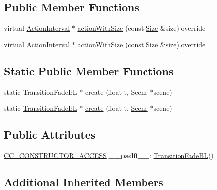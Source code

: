 \subsection*{Public Member Functions}
\begin{DoxyCompactItemize}
\item 
virtual \hyperlink{classActionInterval}{Action\+Interval} $\ast$ \hyperlink{classTransitionFadeBL_a6701b53ec643eb3fc9e078c0feaf71b0}{action\+With\+Size} (const \hyperlink{classSize}{Size} \&size) override
\item 
virtual \hyperlink{classActionInterval}{Action\+Interval} $\ast$ \hyperlink{classTransitionFadeBL_a2669695f07ed13e35046a1507e91abe6}{action\+With\+Size} (const \hyperlink{classSize}{Size} \&size) override
\end{DoxyCompactItemize}
\subsection*{Static Public Member Functions}
\begin{DoxyCompactItemize}
\item 
static \hyperlink{classTransitionFadeBL}{Transition\+Fade\+BL} $\ast$ \hyperlink{classTransitionFadeBL_a485a14c7e0402f080e983c04b7d76c24}{create} (float t, \hyperlink{classScene}{Scene} $\ast$scene)
\item 
static \hyperlink{classTransitionFadeBL}{Transition\+Fade\+BL} $\ast$ \hyperlink{classTransitionFadeBL_aa2728c3f268c9ace4de1e5f1208fdf50}{create} (float t, \hyperlink{classScene}{Scene} $\ast$scene)
\end{DoxyCompactItemize}
\subsection*{Public Attributes}
\begin{DoxyCompactItemize}
\item 
\mbox{\label{classTransitionFadeBL_aa278122252b5f621befc8ce1ecd8a33b}} 
\hyperlink{_2cocos2d_2cocos_2base_2ccConfig_8h_a25ef1314f97c35a2ed3d029b0ead6da0}{C\+C\+\_\+\+C\+O\+N\+S\+T\+R\+U\+C\+T\+O\+R\+\_\+\+A\+C\+C\+E\+SS} {\bfseries \+\_\+\+\_\+pad0\+\_\+\+\_\+}\+: \hyperlink{classTransitionFadeBL}{Transition\+Fade\+BL}()
\end{DoxyCompactItemize}
\subsection*{Additional Inherited Members}



